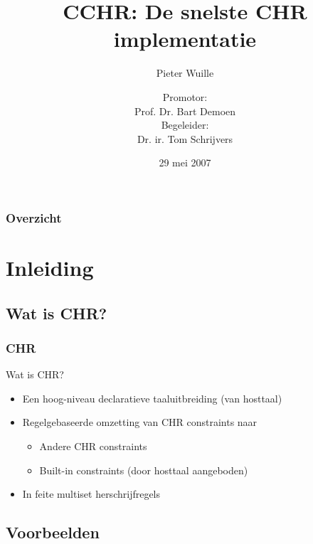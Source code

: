 \documentclass{beamer}
\title{CCHR: De snelste CHR implementatie}
\subtitle{Pieter Wuille}
\author{Promotor: \\
Prof. Dr. Bart Demoen \\
Begeleider: \\
Dr. ir. Tom Schrijvers}
\date{29 mei 2007}
\begin{document}
\frame{\titlepage}


\begin{frame}
  \frametitle{Overzicht}
  \tableofcontents
\end{frame}


\section{Inleiding}

\subsection{Wat is CHR?}

\begin{frame}[containsverbatim]
  \frametitle{CHR}
  \begin{block}{Wat is CHR?}
    \begin{itemize}
      \item Een hoog-niveau declaratieve taaluitbreiding (van hosttaal)
      \item Regelgebaseerde omzetting van CHR constraints naar \begin{itemize}
        \item Andere CHR constraints
        \item Built-in constraints (door hosttaal aangeboden)
      \end{itemize}
      \item In feite multiset herschrijfregels
    \end{itemize}
  \end{block}

\end{frame}

\subsection{Voorbeelden}
\end{document}
